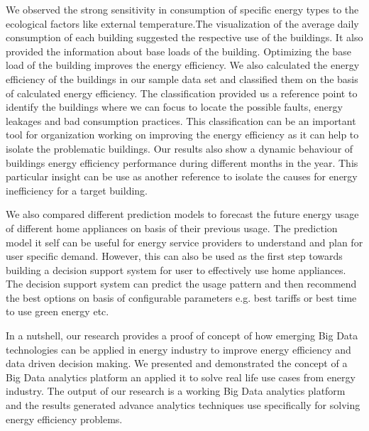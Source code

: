 We observed the strong sensitivity in consumption of specific energy types to the ecological factors like external temperature.The visualization of the average daily consumption of each building suggested the respective use of the buildings. It also provided the information about base loads of the building. Optimizing the base load of the building improves the energy efficiency. We also calculated the energy efficiency of the buildings in our sample data set and classified them on the basis of calculated energy efficiency. The classification provided us a reference point to identify the buildings where we can focus to locate the possible faults, energy leakages and bad consumption practices. This classification can be an important tool for organization working on improving the energy efficiency as it can help to isolate the problematic buildings. Our results also show a dynamic behaviour of buildings energy efficiency performance during different months in the year. This particular insight can be use as another reference to isolate the causes for energy inefficiency for a target building.

We also compared different prediction models to forecast the future energy usage of different home appliances on basis of their previous usage. The prediction model it self can be useful for energy service providers to understand and plan for user specific demand. However, this can also be used as the first step towards building a decision support system for user to effectively use home appliances. The decision support system can predict the usage pattern and then recommend the best options on basis of configurable parameters e.g. best tariffs or best time to use green energy etc. 

In a nutshell, our research provides a proof of concept of how emerging Big Data technologies can be applied in energy industry to improve energy efficiency and data driven decision making. We presented and demonstrated the concept of a Big Data analytics platform an applied it to solve real life use cases from energy industry. The output of our research is a working Big Data analytics platform and the results generated advance analytics techniques use specifically for solving energy efficiency problems.  
     

